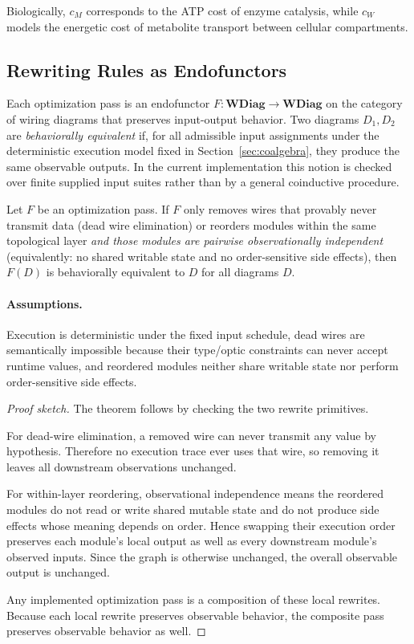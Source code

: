 Biologically, $c_M$ corresponds to the ATP cost of enzyme catalysis,
while $c_W$ models the energetic cost of metabolite transport between
cellular compartments.

\subsection{Rewriting Rules as Endofunctors}

Each optimization pass is an endofunctor $F : \mathbf{WDiag} \to \mathbf{WDiag}$
on the category of wiring diagrams that preserves input-output behavior.
Two diagrams $D_1, D_2$ are \emph{behaviorally equivalent} if, for all
admissible input assignments under the deterministic execution model fixed
in Section~\ref{sec:coalgebra}, they produce the same observable outputs. In the current
implementation this notion is checked over finite supplied input suites
rather than by a general coinductive procedure.

\begin{theorem}\label{thm:optimization-soundness}
Let $F$ be an optimization pass. If $F$ only removes wires that provably
never transmit data (dead wire elimination) or reorders modules within
the same topological layer \emph{and those modules are pairwise observationally independent} (equivalently: no shared writable state and no order-sensitive side effects), then $F(D)$ is
behaviorally equivalent to $D$ for all diagrams $D$.
\end{theorem}

\paragraph{Assumptions.}
Execution is deterministic under the fixed input schedule, dead wires are semantically impossible because their type/optic constraints can never accept runtime values, and reordered modules neither share writable state nor perform order-sensitive side effects.

\begin{proof}[Proof sketch]
The theorem follows by checking the two rewrite primitives.

For dead-wire elimination, a removed wire can never transmit any value by hypothesis. Therefore no execution trace ever uses that wire, so removing it leaves all downstream observations unchanged.

For within-layer reordering, observational independence means the reordered modules do not read or write shared mutable state and do not produce side effects whose meaning depends on order. Hence swapping their execution order preserves each module's local output as well as every downstream module's observed inputs. Since the graph is otherwise unchanged, the overall observable output is unchanged.

Any implemented optimization pass is a composition of these local rewrites. Because each local rewrite preserves observable behavior, the composite pass preserves observable behavior as well.
\end{proof}

